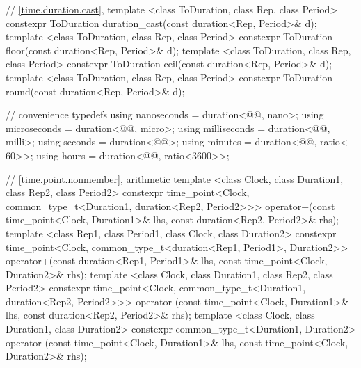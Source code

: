 \begin{codeblock}
{{    // \ref{time.duration.cast}, 
    template <class ToDuration, class Rep, class Period>
      constexpr ToDuration duration_cast(const duration<Rep, Period>& d);
    template <class ToDuration, class Rep, class Period>
      constexpr ToDuration floor(const duration<Rep, Period>& d);
    template <class ToDuration, class Rep, class Period>
      constexpr ToDuration ceil(const duration<Rep, Period>& d);
    template <class ToDuration, class Rep, class Period>
      constexpr ToDuration round(const duration<Rep, Period>& d);

    // convenience typedefs
    using nanoseconds  = duration<@@, nano>;
    using microseconds = duration<@@, micro>;
    using milliseconds = duration<@@, milli>;
    using seconds      = duration<@@>;
    using minutes      = duration<@@, ratio<  60>>;
    using hours        = duration<@@, ratio<3600>>;

    // \ref{time.point.nonmember},  arithmetic
    template <class Clock, class Duration1, class Rep2, class Period2>
      constexpr time_point<Clock, common_type_t<Duration1, duration<Rep2, Period2>>>
      operator+(const time_point<Clock, Duration1>& lhs,
                const duration<Rep2, Period2>& rhs);
    template <class Rep1, class Period1, class Clock, class Duration2>
      constexpr time_point<Clock, common_type_t<duration<Rep1, Period1>, Duration2>>
      operator+(const duration<Rep1, Period1>& lhs,
                const time_point<Clock, Duration2>& rhs);
    template <class Clock, class Duration1, class Rep2, class Period2>
      constexpr time_point<Clock, common_type_t<Duration1, duration<Rep2, Period2>>>
      operator-(const time_point<Clock, Duration1>& lhs,
                const duration<Rep2, Period2>& rhs);
    template <class Clock, class Duration1, class Duration2>
      constexpr common_type_t<Duration1, Duration2>
      operator-(const time_point<Clock, Duration1>& lhs,
                const time_point<Clock, Duration2>& rhs);

}}
\end{codeblock}
